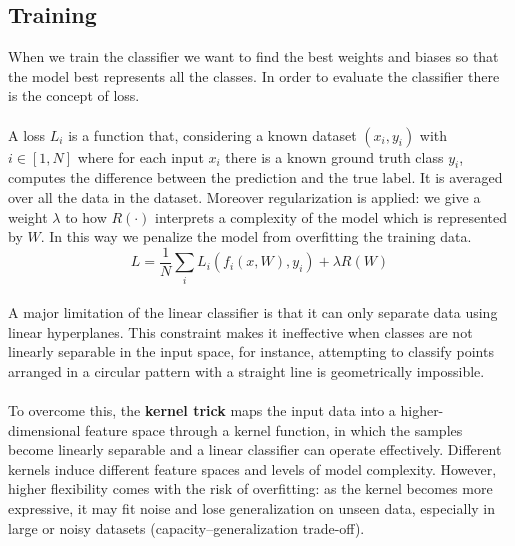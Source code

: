 \subsection{Training}
When we train the classifier we want to find the best weights and biases so that the model best represents all the classes. In order to evaluate the classifier there is the concept of loss. \\\\
A loss $L_i$ is a function that, considering a known dataset $(x_i,y_i)$ with $i \in[1,N]$ where for each input $x_i$ there is a known ground truth class $y_i$, computes the difference between the prediction and the true label. It is averaged over all the data in the dataset. Moreover regularization is applied: we give a weight $\lambda$ to how $R(\cdot)$ interprets a complexity of the model which is represented by $W$. In this way we penalize the model from overfitting the training data.
$$L=\frac{1}{N}\sum_iL_i(f_i(x,W), y_i) + \lambda R(W)$$
\\
A major limitation of the linear classifier is that it can only separate data using linear hyperplanes. This constraint makes it ineffective when classes are not linearly separable in the input space, for instance, attempting to classify points arranged in a circular pattern with a straight line is geometrically impossible.
\\\\
To overcome this, the \textbf{kernel trick} maps the input data into a higher-dimensional feature space through a kernel function, in which the samples become linearly separable and a linear classifier can operate effectively. Different kernels induce different feature spaces and levels of model complexity. However, higher flexibility comes with the risk of overfitting: as the kernel becomes more expressive, it may fit noise and lose generalization on unseen data, especially in large or noisy datasets (capacity–generalization trade-off).


